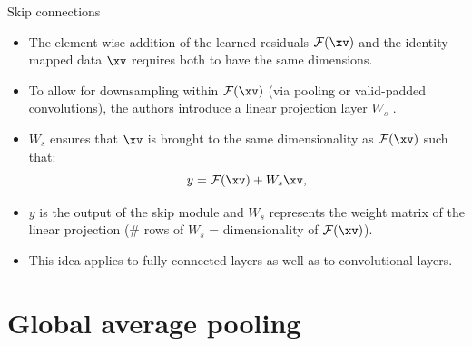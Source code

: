 \begin{vbframe}{Skip connections}
    \begin{itemize}
        \item The element-wise addition of the learned residuals $\mathcal{F}(\xv)$ and the identity-mapped data $\xv$ requires both to have the same dimensions.
        \item To allow for downsampling within $\mathcal{F}(\xv)$ (via pooling or valid-padded convolutions), the authors introduce a linear projection layer $W_s$ .
        \item $W_s$ ensures that $\xv$ is brought to the same dimensionality as $\mathcal{F}(\xv)$ such that:
        $$
            y = \mathcal{F}(\xv) + W_s\xv,
        $$
        \item $y$ is the output of the skip module and $W_s$ represents the weight matrix of the linear projection (\# rows of $W_s$ = dimensionality of $\mathcal{F}(\xv)$).
        \item This idea applies to fully connected layers as well as to convolutional layers.
    \end{itemize}
\end{vbframe}


\section{Global average pooling}


